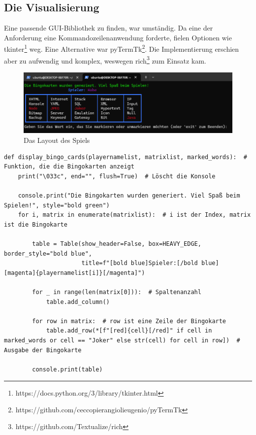 \documentclass{llncs}
\begin{document}
\subsection{Die Visualisierung}

Eine passende GUI-Bibliothek zu finden, war umständig. Da eine der Anforderung eine Kommandozeilenanwendung forderte, fielen Optionen wie tkinter\footnote{https://docs.python.org/3/library/tkinter.html} weg. Eine Alternative war pyTermTk\footnote{https://github.com/ceccopierangiolieugenio/pyTermTk}. Die Implementierung erschien aber zu aufwendig und komplex, weswegen rich\footnote{https://github.com/Textualize/rich} zum Einsatz kam.



\begin{figure}[H]
    \centering
    \includegraphics[width=1\linewidth]{GUI1.png}
    \caption{Das Layout des Spiels}
    \label{fig:layout1}
\end{figure}

\begin{lstlisting}[caption=Umsetzung der Tabelle in Abbildung 2.]
def display_bingo_cards(playernamelist, matrixlist, marked_words):  # Funktion, die die Bingokarten anzeigt
    print("\033c", end="", flush=True)  # Löscht die Konsole

    console.print("Die Bingokarten wurden generiert. Viel Spaß beim Spielen!", style="bold green")
    for i, matrix in enumerate(matrixlist):  # i ist der Index, matrix ist die Bingokarte

        table = Table(show_header=False, box=HEAVY_EDGE, border_style="bold blue",
                      title=f"[bold blue]Spieler:[/bold blue] [magenta]{playernamelist[i]}[/magenta]")

        for _ in range(len(matrix[0])):  # Spaltenanzahl
            table.add_column()

        for row in matrix:  # row ist eine Zeile der Bingokarte
            table.add_row(*[f"[red]{cell}[/red]" if cell in marked_words or cell == "Joker" else str(cell) for cell in row])  # Ausgabe der Bingokarte

        console.print(table)
\end{lstlisting}
\end{document}
